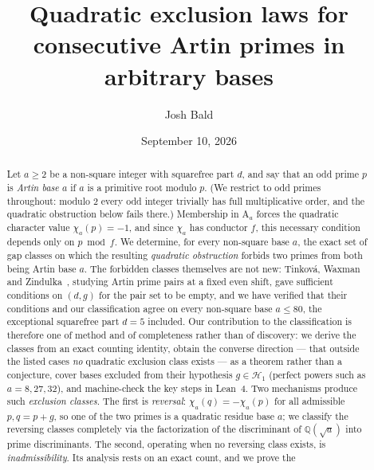 \documentclass[11pt,reqno]{amsart}
\theoremstyle{plain}
\theoremstyle{definition}
\newcommand{\Art}{\mathrm{A}}
\newcommand{\Q}{\mathbb{Q}}
\begin{document}
\title[Quadratic exclusion laws for consecutive Artin primes]
{Quadratic exclusion laws for consecutive Artin primes in arbitrary bases}

\author{Josh Bald}
\address{Ontario, Canada}


\date{September 10, 2026}

\begin{abstract}
Let $a \ge 2$ be a non-square integer with squarefree part $d$, and say that
an odd prime $p$ is \emph{Artin base $a$} if $a$ is a primitive root
modulo $p$. (We restrict to odd primes throughout: modulo $2$ every odd
integer trivially has full multiplicative order, and the quadratic obstruction
below fails there.) Membership in $\Art_a$ forces the quadratic character value
$\chi_a(p) = -1$, and since $\chi_a$ has conductor $f$, this necessary
condition depends only on $p \bmod f$. We determine, for every non-square base
$a$, the exact set of gap classes on which the resulting \emph{quadratic
obstruction} forbids two primes from both being Artin base $a$. The forbidden
classes themselves are not new: Tinkov\'a, Waxman and
Zindulka~\cite{TinkovaWaxmanZindulka2023}, studying Artin prime pairs at a
fixed even shift, gave sufficient conditions on $(d, g)$ for the pair set to
be empty, and we have verified that their conditions and our classification
agree on every non-square base $a \le 80$, the exceptional squarefree part
$d = 5$ included. Our contribution to the classification is therefore one of
method and of completeness rather than of discovery: we derive the classes
from an exact counting identity, obtain the converse direction --- that
outside the listed cases \emph{no} quadratic exclusion class exists --- as a
theorem rather than a conjecture, cover bases excluded from their hypothesis
$g \in \mathcal{H}_1$ (perfect powers such as $a = 8, 27, 32$), and
machine-check the key steps in Lean~4. Two mechanisms
produce such \emph{exclusion classes}. The first is \emph{reversal}:
$\chi_a(q) = -\chi_a(p)$ for all admissible $p, q = p + g$, so one of the two
primes is a quadratic residue base $a$; we classify the reversing classes
completely via the factorization of the discriminant of $\Q(\sqrt{a})$ into
prime discriminants. The second, operating when no reversing class exists, is
\emph{inadmissibility}. Its analysis rests on an exact count, and we prove the

\end{abstract}
\end{document}
